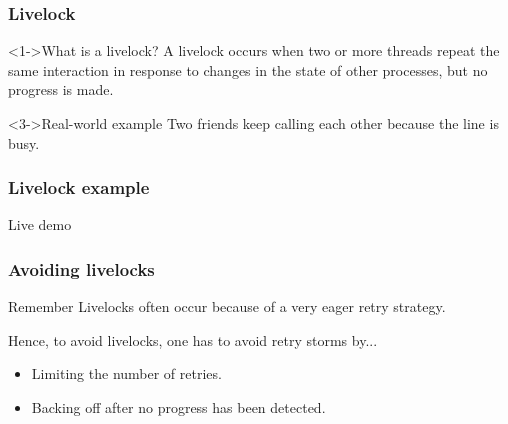 \documentclass[xcolor={dvipsnames,svgnames},aspectratio=169]{beamer}
\begin{document}
\begin{frame}[fragile]
  \frametitle{Livelock}

  \begin{block}<1->{\faSearch \quad What is a livelock?}
    A livelock occurs when two or more threads repeat the same interaction in
    response to changes in the state of other processes, but no progress is
    made. 
  \end{block}
  \vspace{0.5cm}
  \begin{block}<3->{\faSearch \quad Real-world example}
    Two friends keep calling each other because the line is busy.
  \end{block}

\end{frame}

\begin{frame}[fragile]
  \frametitle{Livelock example}

  \centering \huge
  Live demo

\end{frame}

\begin{frame}[fragile]
  \frametitle{Avoiding livelocks}

  \begin{block}{\faExclamationTriangle \quad Remember}
    Livelocks often occur because of a very eager retry strategy.
  \end{block}

  Hence, to avoid livelocks, one has to avoid retry storms by...

  \begin{itemize}
  \item[\faBook]<2-> Limiting the number of retries.
  \item[\faBook]<3-> Backing off after no progress has been detected.
  \end{itemize}

\end{frame}
\end{document}
